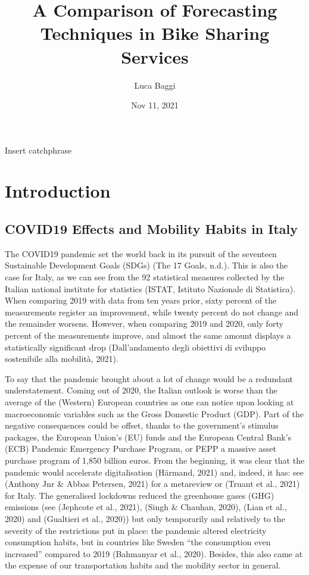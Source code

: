\documentclass[letterpaper,10pt,english]{jupyterBook}
\title{A Comparison of Forecasting Techniques in Bike Sharing Services}
\date{Nov 11, 2021}
\author{Luca Baggi}
\begin{document}
\pagestyle{empty}
\sphinxmaketitle
\pagestyle{plain}
\sphinxtableofcontents
\pagestyle{normal}
\label{\detokenize{frontmatter::doc}}


\sphinxAtStartPar
Insert catchphrase


\chapter{Introduction}
\label{\detokenize{01-introduction:introduction}}\label{\detokenize{01-introduction::doc}}

\section{COVID\sphinxhyphen{}19 Effects and Mobility Habits in Italy}
\label{\detokenize{01-introduction:covid-19-effects-and-mobility-habits-in-italy}}
\sphinxAtStartPar
The COVID\sphinxhyphen{}19 pandemic set the world back in its pursuit of the seventeen Sustainable Development Goals (SDGs) (The 17 Goals, n.d.). This is also the case for Italy, as we can see from the 92 statistical measures collected by the Italian national institute for statistics (ISTAT, Istituto Nazionale di Statistica). When comparing 2019 with data from ten years prior, sixty percent of the measurements register an improvement, while twenty percent do not change and the remainder worsens. However, when comparing 2019 and 2020, only forty percent of the measurements improve, and almost the same amount displays a statistically significant drop (Dall’andamento degli obiettivi di sviluppo sostenibile alla mobilità, 2021).

\sphinxAtStartPar
To say that the pandemic brought about a lot of change would be a redundant understatement. Coming out of 2020, the Italian outlook is worse than the average of the (Western) European countries \sphinxhyphen{} as one can notice upon looking at macroeconomic variables such as the Gross Domestic Product (GDP). Part of the negative consequences could be offset, thanks to the government’s stimulus packages, the European Union’s (EU) funds and the European Central Bank’s (ECB) Pandemic Emergency Purchase Program, or PEPP \sphinxhyphen{} a massive asset purchase program of 1,850 billion euros. From the beginning, it was clear that the pandemic would accelerate digitalisation (Härmand, 2021) \sphinxhyphen{} and, indeed, it has: see (Anthony Jnr \& Abbas Petersen, 2021) for a meta\sphinxhyphen{}review or (Truant et al., 2021) for Italy. The generalised lockdowns reduced the greenhouse gases (GHG) emissions (see (Jephcote et al., 2021), (Singh \& Chauhan, 2020), (Lian et al., 2020) and (Gualtieri et al., 2020)) but only temporarily and relatively to the severity of the restrictions put in place: the pandemic altered electricity consumption habits, but in countries like Sweden “the consumption even increased” compared to 2019 (Bahmanyar et al., 2020). Besides, this also came at the expense of our transportation habits and the mobility sector in general.
\end{document}
